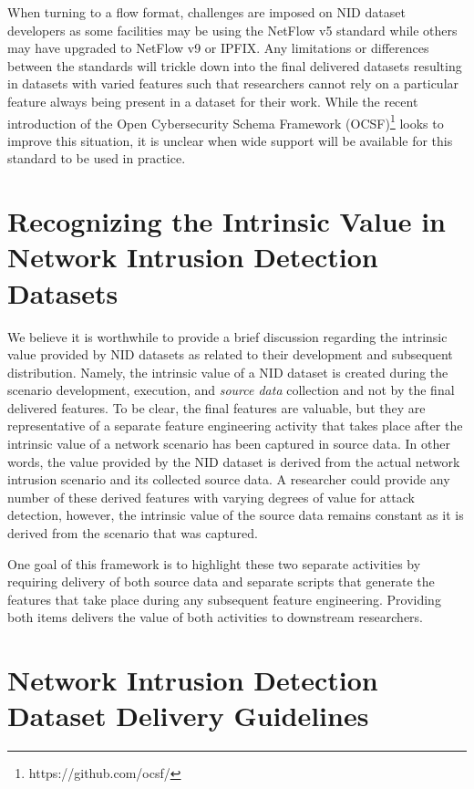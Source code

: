 \documentclass[conference]{IEEEtran}
\begin{document}
When turning to a flow format, challenges are imposed on NID dataset developers as some facilities may be using the NetFlow v5 standard while others may have upgraded to NetFlow v9 or IPFIX.
Any limitations or differences between the standards will trickle down into the final delivered datasets resulting in datasets with varied features such that researchers cannot rely on a particular feature always being present in a dataset for their work.
While the recent introduction of the Open Cybersecurity Schema Framework (OCSF)\footnote{https://github.com/ocsf/} looks to improve this situation, it is unclear when wide support will be available for this  standard to be used in practice.

\section{Recognizing the Intrinsic Value in Network Intrusion Detection Datasets}\label{sec:intrinsic_value}
We believe it is worthwhile to provide a brief discussion regarding the intrinsic value provided by NID datasets as related to their development and subsequent distribution.
Namely, the intrinsic value of a NID dataset is created during the scenario development, execution, and \textit{source data} collection and not by the final delivered features.
To be clear, the final features are valuable, but they are representative of a separate feature engineering activity that takes place after the intrinsic value of a network scenario has been captured in source data.
In other words, the value provided by the NID dataset is derived from the actual network intrusion scenario and its collected source data. 
A researcher could provide any number of these derived features with varying degrees of value for attack detection, however, the intrinsic value of the source data remains constant as it is derived from the scenario that was captured.

One goal of this framework is to highlight these two separate activities by requiring delivery of both source data and separate scripts that generate the features that take place during any subsequent feature engineering.
Providing both items delivers the value of both activities to downstream researchers.

\section{Network Intrusion Detection Dataset Delivery Guidelines}\label{sec:nidddf}
\end{document}
